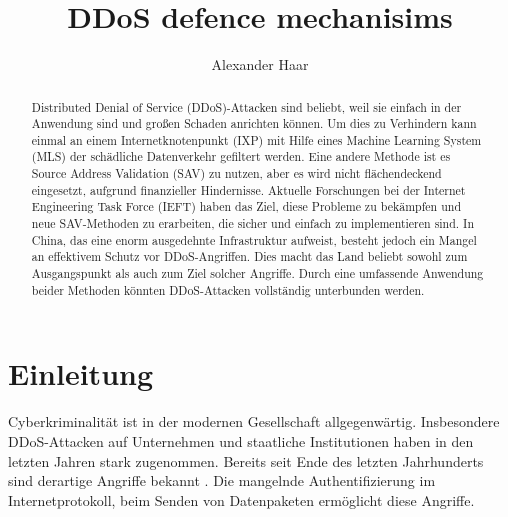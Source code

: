 \documentclass[sigplan,screen]{acmart}
\begin{document}
\title{DDoS defence mechanisims}

\author{Alexander Haar}

\begin{abstract}
Distributed Denial of Service (DDoS)-Attacken sind beliebt, weil sie einfach in der Anwendung sind und großen Schaden anrichten können. Um dies zu Verhindern kann einmal an einem Internetknotenpunkt (IXP) mit Hilfe eines Machine Learning System (MLS) der schädliche Datenverkehr gefiltert werden. Eine andere Methode ist es Source Address Validation (SAV) zu nutzen, aber es wird nicht flächendeckend eingesetzt, aufgrund finanzieller Hindernisse. Aktuelle Forschungen bei der Internet Engineering Task Force (IEFT) haben das Ziel, diese Probleme zu bekämpfen und neue SAV-Methoden zu erarbeiten, die sicher und einfach zu implementieren sind. In China, das eine enorm ausgedehnte Infrastruktur aufweist, besteht jedoch ein Mangel an effektivem Schutz vor DDoS-Angriffen. Dies macht das Land beliebt sowohl zum Ausgangspunkt als auch zum Ziel solcher Angriffe.
Durch eine umfassende Anwendung beider Methoden könnten DDoS-Attacken vollständig unterbunden werden.

\end{abstract}



\maketitle

\section{Einleitung}
Cyberkriminalität ist in der modernen Gesellschaft allgegenwärtig. Insbesondere DDoS-Attacken auf Unternehmen und staatliche Institutionen haben in den letzten Jahren stark zugenommen. Bereits seit Ende des letzten Jahrhunderts sind derartige Angriffe bekannt \cite{manrs01}. Die mangelnde Authentifizierung im Internetprotokoll, beim Senden von Datenpaketen ermöglicht diese Angriffe. 
\end{document}
